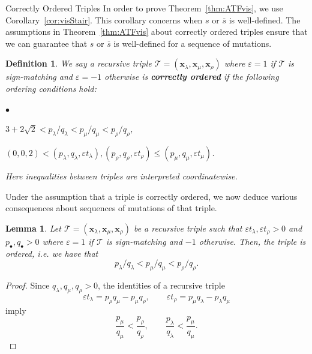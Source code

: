 \documentclass[11pt, reqno]{amsart}
\makeatletter
\def\subsection{\@startsection{subsection}{2}%
  \z@{.5\linespacing\@plus.7\linespacing}{-.5em}%
  {\normalfont\large\bfseries}}
\newtheorem{lemma}[thm]{Lemma}
\newtheorem{definition}[thm]{Definition}
\theoremstyle{remark}
\numberwithin{equation}{subsection}
\numberwithin{figure}{section}
\theoremstyle{customremark}
\newcommand{\Tt}{\mathcal{T}}
\newenvironment{itemlist}
   { \begin{list} {$\bullet$}
         { \setlength{\topsep}{.5ex}  \setlength{\itemsep}{.5ex} \setlength{\leftmargin}{2.5ex} } }
   { \end{list} }
\newcommand{\ov}{\overline}
\newcommand{\la}{{\lambda}}
\newcommand{\eps}{\varepsilon}
\makeatother
\begin{document}
\subsection{Correctly Ordered Triples}
In order to prove Theorem~\ref{thm:ATFvis}, we use Corollary~\ref{cor:visStair}. This corollary concerns when $s$ or $\ov{s}$ is well-defined. The assumptions in Theorem~\ref{thm:ATFvis} about correctly ordered triples ensure that we can guarantee that $s$ or $\ov{s}$ is well-defined for a sequence of mutations.  


\begin{definition} \label{def:correctlyOrdered}
    We say a recursive triple $\Tt=(\bm{x}_\la,\bm{x}_\mu,\bm{x}_\rho)$ where $\eps=1$ if $\Tt$ is sign-matching and $\eps=-1$ otherwise is {\bf correctly ordered} if the following ordering conditions hold: 
    \begin{itemlist}
        \item[{i)}]  $3+2\sqrt{2}<p_\la/q_\la<p_\mu/q_\mu<p_\rho/q_\rho$, 
        \item[{ii)}] $(0,0,2)< (p_\la,q_\la,\eps t_\la),(p_\rho,q_\rho,\eps t_\rho) \leq (p_\mu,q_\mu,\eps t_\mu)$.
    \end{itemlist}
    Here inequalities between triples are interpreted coordinatewise.
\end{definition}



Under the assumption that a triple is correctly ordered, we now deduce various consequences about sequences of mutations of that triple. 
\begin{lemma} \label{lem:ordered}
    Let $\Tt=(\bm{x}_\la,\bm{x}_\mu,\bm{x}_\rho)$ be a recursive triple such that $\eps t_\la,\eps t_\rho>0$ and $p_\bullet,q_\bullet>0$ where $\eps=1$ if $\Tt$ is sign-matching and $-1$ otherwise. Then, the triple is ordered, i.e. we have that
    \[ p_\la/q_\la < p_\mu/q_\mu <p_\rho/q_\rho.\]
    \end{lemma}
\begin{proof}
    Since \(q_\lambda,q_\mu,q_\rho>0\), the identities of a recursive triple
\[
\eps t_\lambda=p_\rho q_\mu-p_\mu q_\rho,\qquad
\eps t_\rho=p_\mu q_\lambda-p_\lambda q_\mu
\]
imply
\[
\frac{p_\mu}{q_\mu}<\frac{p_\rho}{q_\rho},
\qquad
\frac{p_\lambda}{q_\lambda}<\frac{p_\mu}{q_\mu}.
\]
\end{proof}
\end{document}
